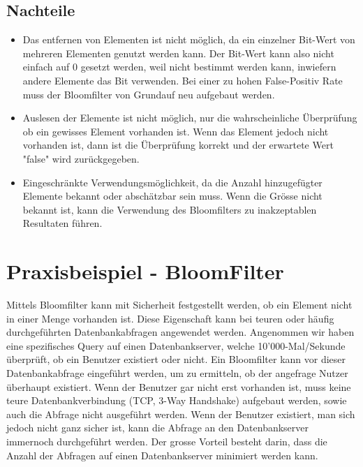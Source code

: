 \documentclass[11pt]{article} %
\begin{document}
	\subsection {Nachteile}
		\begin{itemize}
			\item Das entfernen von Elementen ist nicht möglich, da ein einzelner Bit-Wert von mehreren Elementen genutzt werden kann. Der Bit-Wert kann also nicht einfach auf 0 gesetzt werden, weil nicht bestimmt werden kann, inwiefern andere Elemente das Bit verwenden. Bei einer zu hohen False-Positiv Rate muss der Bloomfilter von Grundauf neu aufgebaut werden.
			\item Auslesen der Elemente ist nicht möglich, nur die wahrscheinliche Überprüfung ob ein gewisses Element vorhanden ist. Wenn das Element jedoch nicht vorhanden ist, dann ist die Überprüfung korrekt und der erwartete Wert "false" wird zurückgegeben.
			\item Eingeschränkte Verwendungsmöglichkeit, da die Anzahl hinzugefügter Elemente bekannt oder abschätzbar sein muss. Wenn die Grösse nicht bekannt ist, kann die Verwendung des Bloomfilters zu inakzeptablen Resultaten führen.
		\end{itemize}

\section{Praxisbeispiel - BloomFilter}

Mittels Bloomfilter kann mit Sicherheit festgestellt werden, ob ein Element nicht in einer Menge vorhanden ist. Diese Eigenschaft kann bei teuren oder häufig durchgeführten Datenbankabfragen angewendet werden. Angenommen wir haben eine spezifisches Query auf einen Datenbankserver, welche 10'000-Mal/Sekunde überprüft, ob ein Benutzer existiert oder nicht. Ein Bloomfilter kann vor dieser Datenbankabfrage eingeführt werden, um zu ermitteln, ob der angefrage Nutzer überhaupt existiert. Wenn der Benutzer gar nicht erst vorhanden ist, muss keine teure Datenbankverbindung (TCP, 3-Way Handshake) aufgebaut werden, sowie auch die Abfrage nicht ausgeführt werden. Wenn der Benutzer existiert, man sich jedoch nicht ganz sicher ist, kann die Abfrage an den Datenbankserver immernoch durchgeführt werden. Der grosse Vorteil besteht darin, dass die Anzahl der Abfragen auf einen Datenbankserver minimiert werden kann.
\end{document}
